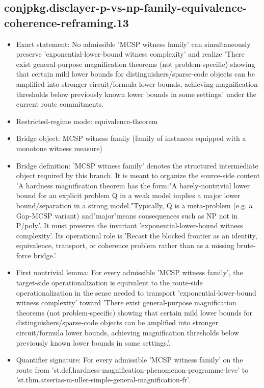 \documentclass[11pt]{article}
\begin{document}
\subsection*{conjpkg.disclayer-p-vs-np-family-equivalence-coherence-reframing.13}
\begin{itemize}
\item Exact statement: No admissible 'MCSP witness family' can simultaneously preserve 'exponential-lower-bound witness complexity' and realize 'There exist general-purpose magnification theorems (not problem-specific) showing that certain mild lower bounds for distinguishers/sparse-code objects can be amplified into stronger circuit/formula lower bounds, achieving magnification thresholds below previously known lower bounds in some settings.' under the current route commitments.
\item Restricted-regime mode: equivalence-theorem
\item Bridge object: MCSP witness family (family of instances equipped with a monotone witness measure)
\item Bridge definition: 'MCSP witness family' denotes the structured intermediate object required by this branch. It is meant to organize the source-side content 'A hardness magnification theorem has the form:"A barely-nontrivial lower bound for an explicit problem Q in a weak model implies a major lower bound/separation in a strong model."Typically, Q is a meta-problem (e.g. a Gap-MCSP variant) and"major"means consequences such as NP not in P/poly.'. It must preserve the invariant 'exponential-lower-bound witness complexity'. Its operational role is 'Recast the blocked frontier as an identity, equivalence, transport, or coherence problem rather than as a missing brute-force bridge.'.
\item First nontrivial lemma: For every admissible 'MCSP witness family', the target-side operationalization is equivalent to the route-side operationalization in the sense needed to transport 'exponential-lower-bound witness complexity' toward 'There exist general-purpose magnification theorems (not problem-specific) showing that certain mild lower bounds for distinguishers/sparse-code objects can be amplified into stronger circuit/formula lower bounds, achieving magnification thresholds below previously known lower bounds in some settings.'.
\item Quantifier signature: For every admissible 'MCSP witness family' on the route from 'st.def.hardness-magnification-phenomenon-programme-leve' to 'st.thm.atserias-m-uller-simple-general-magnification-fr'.

\end{itemize}
\end{document}
